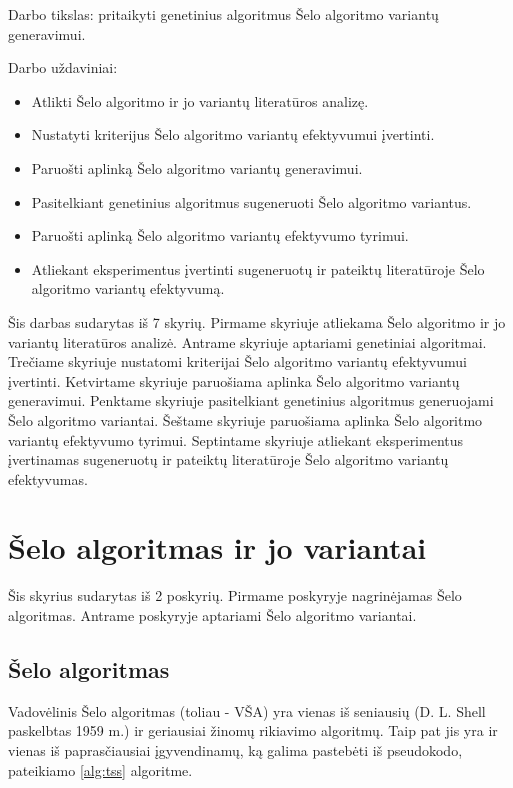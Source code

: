 \documentclass{VUMIFInfKursinis}
\begin{document}

Darbo tikslas:
pritaikyti genetinius algoritmus Šelo algoritmo variantų generavimui.

Darbo uždaviniai:
\begin{itemize}
  \item Atlikti Šelo algoritmo ir jo variantų literatūros analizę.
  \item Nustatyti kriterijus Šelo algoritmo variantų efektyvumui įvertinti.
  \item Paruošti aplinką Šelo algoritmo variantų generavimui.
  \item Pasitelkiant genetinius algoritmus sugeneruoti Šelo algoritmo variantus.
  \item Paruošti aplinką Šelo algoritmo variantų efektyvumo tyrimui.
  \item Atliekant eksperimentus įvertinti sugeneruotų ir pateiktų literatūroje Šelo algoritmo variantų efektyvumą.
\end{itemize}

Šis darbas sudarytas iš 7 skyrių.
Pirmame skyriuje atliekama Šelo algoritmo ir jo variantų literatūros analizė.
Antrame skyriuje aptariami genetiniai algoritmai.
Trečiame skyriuje nustatomi kriterijai Šelo algoritmo variantų efektyvumui įvertinti.
Ketvirtame skyriuje paruošiama aplinka Šelo algoritmo variantų generavimui.
Penktame skyriuje pasitelkiant genetinius algoritmus generuojami Šelo algoritmo variantai.
Šeštame skyriuje paruošiama aplinka Šelo algoritmo variantų efektyvumo tyrimui.
Septintame skyriuje atliekant eksperimentus įvertinamas sugeneruotų ir pateiktų literatūroje Šelo algoritmo variantų efektyvumas.

\section{Šelo algoritmas ir jo variantai}

Šis skyrius sudarytas iš 2 poskyrių.
Pirmame poskyryje nagrinėjamas Šelo algoritmas.
Antrame poskyryje aptariami Šelo algoritmo variantai.

\subsection{Šelo algoritmas}

Vadovėlinis Šelo algoritmas \cite{10.1145/368370.368387} (toliau - VŠA) yra vienas iš seniausių (D. L. Shell paskelbtas 1959 m.) ir geriausiai žinomų rikiavimo algoritmų.
Taip pat jis yra ir vienas iš paprasčiausiai įgyvendinamų,
ką galima pastebėti iš pseudokodo, pateikiamo \ref{alg:tss} algoritme.
\end{document}
